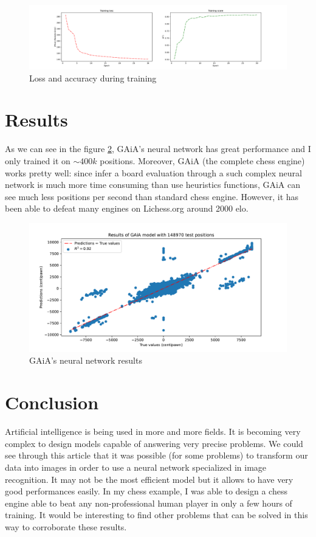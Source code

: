 \documentclass[a4paper]{article}
\begin{document}
\begin{figure}[H]
  \centering
  \includegraphics[width=15cm]{GAiA_history.pdf}
  \caption{Loss and accuracy during training}
  \label{fig:history}
\end{figure}

\section{Results}
As we can see in the figure \ref{fig:result}, GAiA's neural network
has great performance and I only trained it on $\sim 400k$ positions.
Moreover, GAiA (the complete chess engine) works pretty well:
since infer a board evaluation through a such complex neural network
is much more time consuming than use heuristics functions, GAiA can see
much less positions per second than standard chess engine. However,
it has been able to defeat many engines on Lichess.org around 2000 elo.


\begin{figure}[H]
  \centering
  \includegraphics[width=13cm]{result.pdf}
  \caption{GAiA's neural network results}
  \label{fig:result}
\end{figure}

\section{Conclusion}
Artificial intelligence is being used in more and more fields.
It is becoming very complex to design models capable of answering very precise problems.
We could see through this article that it was possible (for some problems) to transform
our data into images in order to use a neural network specialized in image recognition.
It may not be the most efficient model but it allows to have very good performances easily.
In my chess example, I was able to design a chess engine able to beat any non-professional
human player in only a few hours of training. It would be interesting to find other problems
that can be solved in this way to corroborate these results.



\end{document}
